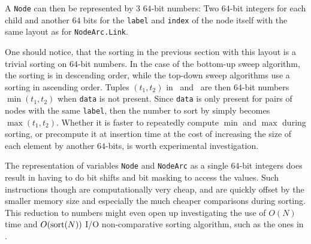 A \lstinline{Node} can then be represented by $3$ $64$-bit numbers: Two $64$-bit
integers for each child and another $64$ bits for the \lstinline{label} and
\lstinline{index} of the node itself with the same layout as for
\lstinline{NodeArc.Link}.

One should notice, that the sorting in the previous section with this layout is
a trivial sorting on $64$-bit numbers. In the case of the bottom-up sweep
algorithm, the sorting is in descending order, while the top-down sweep
algorithms use a sorting in ascending order. Tuples $(t_1,t_2)$ in \Apply\ and
\Equal\ are then $64$-bit numbers $\min(t_1,t_2)$ when \lstinline{data} is not
present. Since \lstinline{data} is only present for pairs of nodes with the same
\lstinline{label}, then the number to sort by simply becomes $\max(t_1,t_2)$.
Whether it is faster to repeatedly compute $\min$ and $\max$ during sorting, or
precompute it at insertion time at the cost of increasing the size of each
element by another $64$-bits, is worth experimental investigation.

The representation of variables \lstinline{Node} and \lstinline{NodeArc} as a
single $64$-bit integers does result in having to do bit shifts and bit masking
to access the values. Such instructions though are computationally very cheap,
and are quickly offset by the smaller memory size and especially the much
cheaper comparisons during sorting. This reduction to numbers might even open up
investigating the use of $O(N)$ time and $O(\text{sort}(N))$ I/O non-comparative sorting
algorithm, such as the ones in \todocite.

